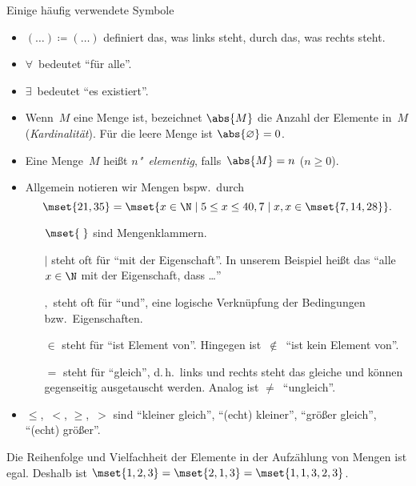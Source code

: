 \documentclass[a4paper]{article}
\begin{document}
\begin{notation}
    Einige häufig verwendete Symbole
    \begin{itemize}
        \item $(\dots) \coloneqq (\dots)$ definiert das, was links steht, durch das, was rechts steht.
        \item $\forall$~bedeutet "`für alle"'.
        \item $\exists$~bedeutet "`es existiert"'.
        \item Wenn~$M$ eine Menge ist, bezeichnet $\abs{M}$ die Anzahl der Elemente in~$M$ (\emph{Kardinalität}). Für die leere Menge ist $\abs{\varnothing} = 0$.
        \item Eine Menge~$M$ heißt \emph{$n$"~elementig}, falls~$\abs{M} = n$ ($n \geq 0$).
        \item Allgemein notieren wir Mengen bspw.\ durch
              \begin{equation*}
                  \mset{21, 35} = \mset{x \in \N \mid 5 \leq x \leq 40, 7 \mid x, x \in \mset{7, 14, 28}}.
              \end{equation*}

              \begin{itemize}
                  \item[$\mset{\;}$] sind Mengenklammern.
                  \item[$\mid$]steht oft für "`mit der Eigenschaft"'. In unserem Beispiel heißt das "`alle $x \in \N$ mit der Eigenschaft, dass \dots"'
                  \item[$,$] steht oft für "`und"', eine logische Verknüpfung der Bedingungen bzw.\ Eigenschaften.
                  \item[$\in$] steht für "`ist Element von"'. Hingegen ist~$\notin$~"`ist kein Element von"'.
                  \item[$=$] steht für "`gleich"', d.\,h.\ links und rechts steht das gleiche und können gegenseitig ausgetauscht werden. Analog ist $\neq$~"`ungleich"'.
              \end{itemize}
        \item $\leq$,~$<$, $\geq$,~$>$ sind "`kleiner gleich"', "`(echt) kleiner"', "`größer gleich"', "`(echt) größer"'.
    \end{itemize}
\end{notation}

\begin{remark}
    Die Reihenfolge und Vielfachheit der Elemente in der Aufzählung von Mengen ist egal. Deshalb ist $\mset{1, 2, 3} = \mset{2, 1, 3} = \mset{1, 1, 3, 2, 3}$.
\end{remark}
\end{document}
